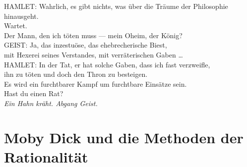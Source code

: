 \begin{playdialog}
HAMLET: Wahrlich, es gibt nichts, was über die Träume der Philosophie hinausgeht.\\
Wartet.\\
Der Mann, den ich töten muss — mein Oheim, der König?\\

%
GEIST: Ja, das inzestuöse, das ehebrecherische Biest,\\
mit Hexerei seines Verstandes, mit verräterischen Gaben … \\

HAMLET: In der Tat, er hat solche Gaben, dass ich fast verzweifle,\\
ihn zu töten und doch den Thron zu besteigen.\\
Es wird ein furchtbarer Kampf um furchtbare Einsätze sein.\\
Hast du einen Rat?\\

\emph{Ein Hahn kräht. Abgang Geist.}\\

\end{playdialog}

\section{Moby Dick und die Methoden der Rationalität}

